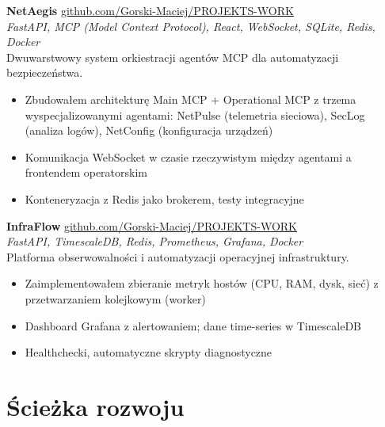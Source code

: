 \documentclass[a4paper,10pt]{article}
\newcommand{\projecttitle}[1]{\textbf{\large #1}}
\begin{document}
\vspace{0.25em}
\projecttitle{NetAegis} \hfill \href{https://github.com/Gorski-Maciej/PROJEKTS-WORK/tree/main/netaegis}{\textcolor{goldDark}{github.com/Gorski-Maciej/PROJEKTS-WORK}} \\
\textit{FastAPI, MCP (Model Context Protocol), React, WebSocket, SQLite, Redis, Docker} \\
Dwuwarstwowy system orkiestracji agentów MCP dla automatyzacji bezpieczeństwa.
\begin{itemize}
  \item Zbudowałem architekturę Main MCP + Operational MCP z trzema wyspecjalizowanymi agentami: NetPulse (telemetria sieciowa), SecLog (analiza logów), NetConfig (konfiguracja urządzeń)
  \item Komunikacja WebSocket w czasie rzeczywistym między agentami a frontendem operatorskim
  \item Konteneryzacja z Redis jako brokerem, testy integracyjne
\end{itemize}

\vspace{0.25em}
\projecttitle{InfraFlow} \hfill \href{https://github.com/Gorski-Maciej/PROJEKTS-WORK/tree/main/infraflow}{\textcolor{goldDark}{github.com/Gorski-Maciej/PROJEKTS-WORK}} \\
\textit{FastAPI, TimescaleDB, Redis, Prometheus, Grafana, Docker} \\
Platforma obserwowalności i automatyzacji operacyjnej infrastruktury.
\begin{itemize}
  \item Zaimplementowałem zbieranie metryk hostów (CPU, RAM, dysk, sieć) z przetwarzaniem kolejkowym (worker)
  \item Dashboard Grafana z alertowaniem; dane time-series w TimescaleDB
  \item Healthchecki, automatyczne skrypty diagnostyczne
\end{itemize}

\vspace{0.6em}

\section{Ścieżka rozwoju}
\end{document}
